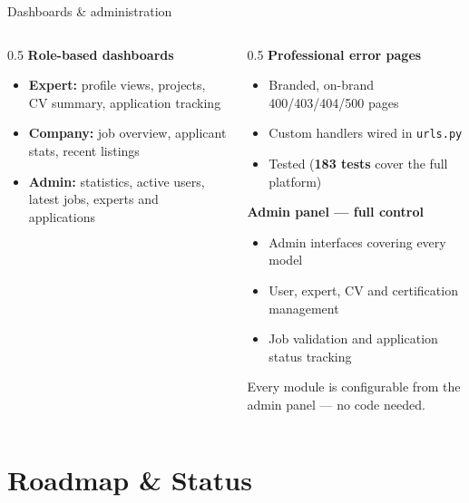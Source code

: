 \documentclass[aspectratio=169, 10pt]{beamer}
\newcommand{\keypoint}[1]{%
  \begin{tcolorbox}[enhanced, colback=utlight, colframe=utteal,
    boxrule=0pt, leftrule=3pt, arc=2pt, boxsep=4pt, left=6pt, right=6pt, top=4pt, bottom=4pt]
    \color{utnavy}#1
  \end{tcolorbox}%
}
\begin{document}
\begin{frame}{Dashboards \& administration}
  \begin{columns}[T]
    \begin{column}{0.5\textwidth}
      \textbf{Role-based dashboards}
      \begin{itemize}
        \item \textbf{Expert:} profile views, projects, CV summary, application tracking
        \item \textbf{Company:} job overview, applicant stats, recent listings
        \item \textbf{Admin:} statistics, active users, latest jobs, experts and applications
      \end{itemize}
    \end{column}
    \begin{column}{0.5\textwidth}
      \textbf{Professional error pages}
      \begin{itemize}
        \item Branded, on-brand 400/403/404/500 pages
        \item Custom handlers wired in \texttt{urls.py}
        \item Tested (\textbf{183 tests} cover the full platform)
      \end{itemize}
      \vspace{4pt}
      \textbf{Admin panel --- full control}
      \begin{itemize}
        \item Admin interfaces covering every model
        \item User, expert, CV and certification management
        \item Job validation and application status tracking
      \end{itemize}
      \vspace{4pt}
      \keypoint{\small Every module is configurable from the admin panel --- no code needed.}
    \end{column}
  \end{columns}
\end{frame}

\section{Roadmap \& Status}
\end{document}
